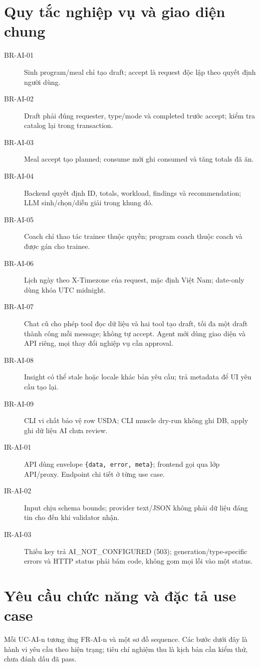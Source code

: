 \documentclass[12pt,a4paper]{article}
\newcommand{\code}[1]{\texttt{#1}}
\begin{document}
\section{Quy tắc nghiệp vụ và giao diện chung}
\begin{description}
  \item[BR-AI-01] Sinh program/meal chỉ tạo draft; accept là request độc lập theo quyết định người dùng.
  \item[BR-AI-02] Draft phải đúng requester, type/mode và completed trước accept; kiểm tra catalog lại trong transaction.
  \item[BR-AI-03] Meal accept tạo planned; consume mới ghi consumed và tăng totals đã ăn.
  \item[BR-AI-04] Backend quyết định ID, totals, workload, findings và recommendation; LLM sinh/chọn/diễn giải trong khung đó.
  \item[BR-AI-05] Coach chỉ thao tác trainee thuộc quyền; program coach thuộc coach và được gán cho trainee.
  \item[BR-AI-06] Lịch ngày theo X-Timezone của request, mặc định Việt Nam; date-only dùng khóa UTC midnight.
  \item[BR-AI-07] Chat cũ cho phép tool đọc dữ liệu và hai tool tạo draft, tối đa một draft thành công mỗi message; không tự accept. Agent mới dùng giao diện và API riêng, mọi thay đổi nghiệp vụ cần approval.
  \item[BR-AI-08] Insight có thể stale hoặc locale khác bản yêu cầu; trả metadata để UI yêu cầu tạo lại.
  \item[BR-AI-09] CLI vi chất bảo vệ row USDA; CLI muscle dry-run không ghi DB, apply ghi dữ liệu AI chưa review.
  \item[IR-AI-01] API dùng envelope \code{\{data, error, meta\}}; frontend gọi qua lớp API/proxy. Endpoint chi tiết ở từng use case.
  \item[IR-AI-02] Input chịu schema bounds; provider text/JSON không phải dữ liệu đáng tin cho đến khi validator nhận.
  \item[IR-AI-03] Thiếu key trả AI\_NOT\_CONFIGURED (503); generation/type-specific errors và HTTP status phải bám code, không gom mọi lỗi vào một status.
\end{description}

\section{Yêu cầu chức năng và đặc tả use case}
Mỗi UC-AI-n tương ứng FR-AI-n và một sơ đồ sequence. Các bước dưới đây là hành vi yêu cầu theo hiện trạng; tiêu chí nghiệm thu là kịch bản cần kiểm thử, chưa đánh dấu đã pass.
\end{document}
